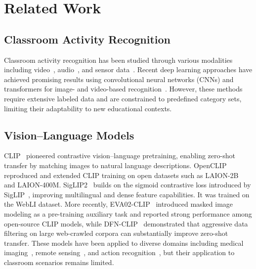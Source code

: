 \documentclass[symmetry,article,submit,pdftex,moreauthors]{Definitions/mdpi}
\begin{document}
\section{Related Work}
\label{sec:related}

\subsection{Classroom Activity Recognition}

Classroom activity recognition has been studied through various modalities including video~\cite{whitehill2014automated}, audio~\cite{donnelly2017automatic}, and sensor data~\cite{dillenbourg2011classroom}.
Recent deep learning approaches have achieved promising results using convolutional neural networks (CNNs) and transformers for image- and video-based recognition~\cite{zhang2020classroom_cnn,li2022classroom_transformer}.
However, these methods require extensive labeled data and are constrained to predefined category sets, limiting their adaptability to new educational contexts.

\subsection{Vision--Language Models}

CLIP~\cite{radford2021learning} pioneered contrastive vision--language pretraining, enabling zero-shot transfer by matching images to natural language descriptions.
OpenCLIP~\cite{cherti2023reproducible} reproduced and extended CLIP training on open datasets such as LAION-2B~\cite{schuhmann2022laion5b} and LAION-400M.
SigLIP2~\cite{tschannen2025siglip2} builds on the sigmoid contrastive loss introduced by SigLIP~\cite{zhai2023sigmoid}, improving multilingual and dense feature capabilities. It was trained on the WebLI dataset.
More recently, EVA02-CLIP~\cite{sun2023eva02} introduced masked image modeling as a pre-training auxiliary task and reported strong performance among open-source CLIP models, while DFN-CLIP~\cite{fang2023data} demonstrated that aggressive data filtering on large web-crawled corpora can substantially improve zero-shot transfer.
These models have been applied to diverse domains including medical imaging~\cite{wang2022medclip}, remote sensing~\cite{liu2024remoteclip}, and action recognition~\cite{wang2021actionclip}, but their application to classroom scenarios remains limited.
\end{document}
